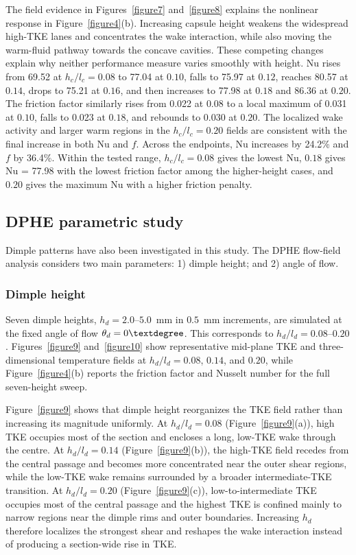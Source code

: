 \documentclass[energies,article,submit,moreauthors,noheaderline]{Definitions/mdpi}
\newcommand{\degree}{\texorpdfstring{\ensuremath{^\circ}}{\textdegree}}
\def\ensuremath#1{}%
\def\degree{\textdegree}%
\def\,{ }%
\begin{document}
The field evidence in Figures~\ref{figure7} and~\ref{figure8} explains the nonlinear response in Figure~\ref{figure4}(b). Increasing capsule height weakens the widespread high-TKE lanes and concentrates the wake interaction, while also moving the warm-fluid pathway towards the concave cavities. These competing changes explain why neither performance measure varies smoothly with height. Nu rises from 69.52 at $h_c/l_c=0.08$ to 77.04 at $0.10$, falls to 75.97 at $0.12$, reaches 80.57 at $0.14$, drops to 75.21 at $0.16$, and then increases to 77.98 at $0.18$ and 86.36 at $0.20$. The friction factor similarly rises from 0.022 at $0.08$ to a local maximum of 0.031 at $0.10$, falls to 0.023 at $0.18$, and rebounds to 0.030 at $0.20$. The localized wake activity and larger warm regions in the $h_c/l_c=0.20$ fields are consistent with the final increase in both Nu and $f$. Across the endpoints, Nu increases by 24.2\% and $f$ by 36.4\%. Within the tested range, $h_c/l_c=0.08$ gives the lowest Nu, $0.18$ gives Nu\,=\,77.98 with the lowest friction factor among the higher-height cases, and $0.20$ gives the maximum Nu with a higher friction penalty.

\subsection{DPHE parametric study}
\label{sec:dphe_results}

Dimple patterns have also been investigated in this study. The DPHE flow-field analysis considers two main parameters: 1) dimple height; and 2) angle of flow.

\subsubsection{Dimple height}
\label{sec:disc_dimple_height}

Seven dimple heights, $h_d=2.0$--$5.0$~mm in $0.5$~mm increments, are simulated at the fixed angle of flow $\theta_d=0\degree$. This corresponds to $h_d/l_d=0.08$--$0.20$. Figures~\ref{figure9} and~\ref{figure10} show representative mid-plane TKE and three-dimensional temperature fields at $h_d/l_d=0.08$, $0.14$, and $0.20$, while Figure~\ref{figure4}(b) reports the friction factor and Nusselt number for the full seven-height sweep.



Figure~\ref{figure9} shows that dimple height reorganizes the TKE field rather than increasing its magnitude uniformly. At $h_d/l_d=0.08$ (Figure~\ref{figure9}(a)), high TKE occupies most of the section and encloses a long, low-TKE wake through the centre. At $h_d/l_d=0.14$ (Figure~\ref{figure9}(b)), the high-TKE field recedes from the central passage and becomes more concentrated near the outer shear regions, while the low-TKE wake remains surrounded by a broader intermediate-TKE transition. At $h_d/l_d=0.20$ (Figure~\ref{figure9}(c)), low-to-intermediate TKE occupies most of the central passage and the highest TKE is confined mainly to narrow regions near the dimple rims and outer boundaries. Increasing $h_d$ therefore localizes the strongest shear and reshapes the wake interaction instead of producing a section-wide rise in TKE.
\end{document}
